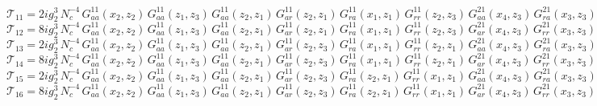 \documentclass{article}
\begin{document}
\begin{equation*}
\mathcal{T}_{11} = 2 i g_{2}^{3}\,N_c^{-4}\,G^{11}_{aa}\left(x_2,z_{2}\right) \, G^{11}_{aa}\left(z_{1},z_{3}\right) \, G^{11}_{aa}\left(z_{2},z_{1}\right) \, G^{11}_{ar}\left(z_{2},z_{1}\right) \, G^{11}_{ra}\left(x_1,z_{1}\right) \, G^{11}_{rr}\left(z_{2},z_{3}\right) \, G^{21}_{aa}\left(x_4,z_{3}\right) \, G^{21}_{ra}\left(x_3,z_{3}\right)
\end{equation*}
\begin{equation*}
\mathcal{T}_{12} = 8 i g_{2}^{3}\,N_c^{-4}\,G^{11}_{aa}\left(x_2,z_{2}\right) \, G^{11}_{aa}\left(z_{1},z_{3}\right) \, G^{11}_{aa}\left(z_{2},z_{1}\right) \, G^{11}_{ar}\left(z_{2},z_{1}\right) \, G^{11}_{ra}\left(x_1,z_{1}\right) \, G^{11}_{rr}\left(z_{2},z_{3}\right) \, G^{21}_{ar}\left(x_4,z_{3}\right) \, G^{21}_{rr}\left(x_3,z_{3}\right)
\end{equation*}
\begin{equation*}
\mathcal{T}_{13} = 2 i g_{2}^{3}\,N_c^{-4}\,G^{11}_{aa}\left(x_2,z_{2}\right) \, G^{11}_{aa}\left(z_{1},z_{3}\right) \, G^{11}_{aa}\left(z_{2},z_{1}\right) \, G^{11}_{ar}\left(z_{2},z_{3}\right) \, G^{11}_{ra}\left(x_1,z_{1}\right) \, G^{11}_{rr}\left(z_{2},z_{1}\right) \, G^{21}_{aa}\left(x_4,z_{3}\right) \, G^{21}_{ra}\left(x_3,z_{3}\right)
\end{equation*}
\begin{equation*}
\mathcal{T}_{14} = 8 i g_{2}^{3}\,N_c^{-4}\,G^{11}_{aa}\left(x_2,z_{2}\right) \, G^{11}_{aa}\left(z_{1},z_{3}\right) \, G^{11}_{aa}\left(z_{2},z_{1}\right) \, G^{11}_{ar}\left(z_{2},z_{3}\right) \, G^{11}_{ra}\left(x_1,z_{1}\right) \, G^{11}_{rr}\left(z_{2},z_{1}\right) \, G^{21}_{ar}\left(x_4,z_{3}\right) \, G^{21}_{rr}\left(x_3,z_{3}\right)
\end{equation*}
\begin{equation*}
\mathcal{T}_{15} = 2 i g_{2}^{3}\,N_c^{-4}\,G^{11}_{aa}\left(x_2,z_{2}\right) \, G^{11}_{aa}\left(z_{1},z_{3}\right) \, G^{11}_{aa}\left(z_{2},z_{1}\right) \, G^{11}_{ar}\left(z_{2},z_{3}\right) \, G^{11}_{ra}\left(z_{2},z_{1}\right) \, G^{11}_{rr}\left(x_1,z_{1}\right) \, G^{21}_{aa}\left(x_4,z_{3}\right) \, G^{21}_{ra}\left(x_3,z_{3}\right)
\end{equation*}
\begin{equation*}
\mathcal{T}_{16} = 8 i g_{2}^{3}\,N_c^{-4}\,G^{11}_{aa}\left(x_2,z_{2}\right) \, G^{11}_{aa}\left(z_{1},z_{3}\right) \, G^{11}_{aa}\left(z_{2},z_{1}\right) \, G^{11}_{ar}\left(z_{2},z_{3}\right) \, G^{11}_{ra}\left(z_{2},z_{1}\right) \, G^{11}_{rr}\left(x_1,z_{1}\right) \, G^{21}_{ar}\left(x_4,z_{3}\right) \, G^{21}_{rr}\left(x_3,z_{3}\right)
\end{equation*}
\end{document}
